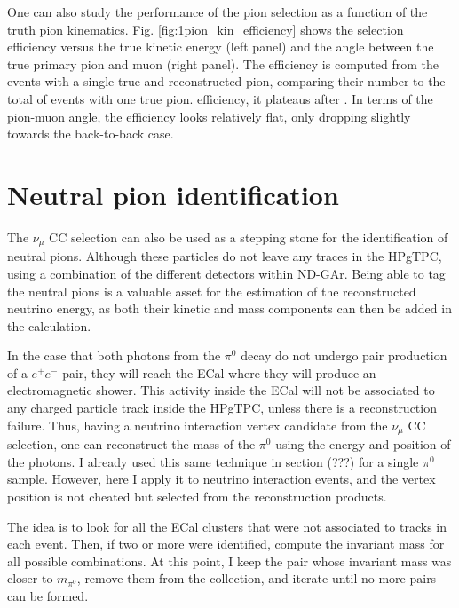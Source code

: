 One can also study the performance of the pion selection as a function of the truth pion kinematics. Fig. \ref{fig:1pion_kin_efficiency} shows the selection efficiency versus the true kinetic energy (left panel) and the angle between the true primary pion and muon (right panel). The efficiency is computed from the events with a single true and reconstructed pion, comparing their number to the total of events with one true pion. efficiency, it plateaus after . In terms of the pion-muon angle, the efficiency looks relatively flat, only dropping slightly towards the back-to-back case.

\section{Neutral pion identification}

The $\nu_{\mu}$ CC selection can also be used as a stepping stone for the identification of neutral pions. Although these particles do not leave any traces in the HPgTPC, using a combination of the different detectors within ND-GAr. Being able to tag the neutral pions is a valuable asset for the estimation of the reconstructed neutrino energy, as both their kinetic and mass components can then be added in the calculation.

In the case that both photons from the $\pi^{0}$ decay do not undergo pair production of a $e^{+}e^{-}$ pair, they will reach the ECal where they will produce an electromagnetic shower. This activity inside the ECal will not be associated to any charged particle track inside the HPgTPC, unless there is a reconstruction failure. Thus, having a neutrino interaction vertex candidate from the $\nu_{\mu}$ CC selection, one can reconstruct the mass of the $\pi^{0}$ using the energy and position of the photons. I already used this same technique in section (???) for a single $\pi^{0}$ sample. However, here I apply it to neutrino interaction events, and the vertex position is not cheated but selected from the reconstruction products.

The idea is to look for all the ECal clusters that were not associated to tracks in each event. Then, if two or more were identified, compute the invariant mass for all possible combinations. At this point, I keep the pair whose invariant mass was closer to $m_{\pi^{0}}$, remove them from the collection, and iterate until no more pairs can be formed.

